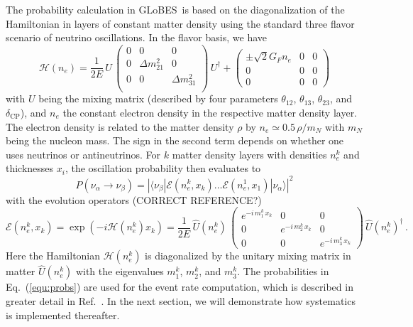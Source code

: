 \documentclass[12pt,a4paper]{article}
\newcommand{\eq}{Eq.}
\newcommand{\Ref}{Ref.}
\newcommand{\ldm}{\Delta m_{31}^2}
\newcommand{\sdm}{\Delta m_{21}^2}
\newcommand{\deltacp}{\delta_{\mathrm{CP}}}
\newcommand{\GLOBES}{{\sf GLoBES}}
\newcommand{\equ}[1]{\eq~(\ref{equ:#1})}
\begin{document}
The probability calculation in \GLOBES\ is based on the diagonalization of the
Hamiltonian in layers of constant matter density using the standard three flavor
scenario of neutrino oscillations. In the flavor basis, we have
\begin{equation}
\mathcal{H}(n_e) = \frac{1}{2E} \, U \,
\left(
\begin{array}{ccc}
0 & 0 & 0 \\
0  & \sdm & 0 \\
0  & 0 & \ldm \\
\end{array}
\right) \,
U^\dagger + 
\left(
\begin{array}{ccc}
 \pm \sqrt{2} G_F n_e & 0 & 0 \\
0 & 0 & 0 \\
0 & 0 & 0 
\end{array}
\right)
\label{equ:ham}
\end{equation}
with $U$ being the mixing matrix (described by four parameters $\theta_{12}$, $\theta_{13}$, $\theta_{23}$, and $\deltacp$), and $n_e$ the constant electron density
in the respective matter density layer. The electron density is related to the matter density $\rho$ by 
$n_e \simeq 0.5 \, \rho/m_N$ with $m_N$ being the nucleon mass. The sign in the second term depends on whether one
uses neutrinos or antineutrinos. For $k$ matter density layers with densities
$n^k_e$ and thicknesses $x_i$, the oscillation probability then evaluates to
\begin{equation}
P(\nu_\alpha \rightarrow \nu_\beta) = \left| \langle \nu_\beta | \mathcal{E}(n^k_e, x_k) \hdots  \mathcal{E}(n^1_e, x_1) | \nu_\alpha \rangle \right|^2
\label{equ:probs}
\end{equation}
with the evolution operators (CORRECT REFERENCE?)
\begin{equation}
  \mathcal{E}(n^k_e, x_k) = \exp \left( -i \mathcal{H}(n^k_e) x_k \right) = \frac{1}{2E} \, \hat{U}(n^k_e) \, \left( \begin{array}{ccc}
e^{-i \, m_1^k \, x_k} & 0 & 0 \\
0 &  e^{-i \, m_2^k \, x_k} & 0 \\
0 & 0 & e^{-i \, m_3^k \, x_k} 
\end{array}
\right) \, \hat{U}(n^k_e)^\dagger \, .
\end{equation}
Here the Hamiltonian $\mathcal{H}(n^k_e)$ is diagonalized by the unitary mixing matrix in matter $\hat{U}(n^k_e)$
with the eigenvalues $m_1^k$, $m_2^k$, and $m_3^k$. The probabilities in \equ{probs} are used for the
event rate computation, which is described in greater detail in \Ref~\cite{Huber:2004ka}. In the next section,
we will demonstrate how systematics is implemented thereafter.
\end{document}
